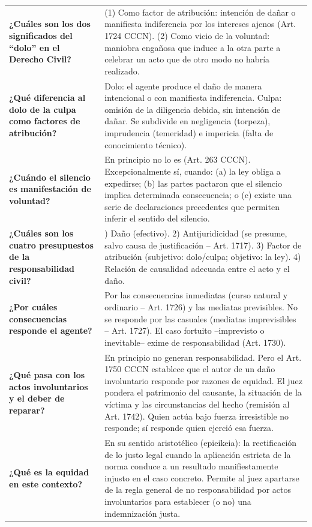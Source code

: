 \documentclass[12pt,oneside]{book}
\begin{document}
\begin{longtable}{
    >{\raggedright\arraybackslash}p{}
    >{\raggedright\arraybackslash}p{}
}
\textbf{¿Cuáles son los dos significados del ``dolo'' en el Derecho Civil?} &
(1) Como factor de atribución: intención de dañar o manifiesta indiferencia por los intereses ajenos (Art. 1724 CCCN). (2) Como vicio de la voluntad: maniobra engañosa que induce a la otra parte a celebrar un acto que de otro modo no habría realizado. \\

\textbf{¿Qué diferencia al dolo de la culpa como factores de atribución?} &
Dolo: el agente produce el daño de manera intencional o con manifiesta indiferencia. Culpa: omisión de la diligencia debida, sin intención de dañar. Se subdivide en negligencia (torpeza), imprudencia (temeridad) e impericia (falta de conocimiento técnico). \\

\textbf{¿Cuándo el silencio es manifestación de voluntad?} &
En principio no lo es (Art. 263 CCCN). Excepcionalmente sí, cuando: (a) la ley obliga a expedirse; (b) las partes pactaron que el silencio implica determinada consecuencia; o (c) existe una serie de declaraciones precedentes que permiten inferir el sentido del silencio. \\

\textbf{¿Cuáles son los cuatro presupuestos de la responsabilidad civil?} &
1) Daño (efectivo). 2) Antijuridicidad (se presume, salvo causa de justificación -- Art. 1717). 3) Factor de atribución (subjetivo: dolo/culpa; objetivo: la ley). 4) Relación de causalidad adecuada entre el acto y el daño. \\

\textbf{¿Por cuáles consecuencias responde el agente?} &
Por las consecuencias inmediatas (curso natural y ordinario -- Art. 1726) y las mediatas previsibles. No se responde por las casuales (mediatas imprevisibles -- Art. 1727). El caso fortuito --imprevisto o inevitable-- exime de responsabilidad (Art. 1730). \\

\textbf{¿Qué pasa con los actos involuntarios y el deber de reparar?} &
En principio no generan responsabilidad. Pero el Art. 1750 CCCN establece que el autor de un daño involuntario responde por razones de equidad. El juez pondera el patrimonio del causante, la situación de la víctima y las circunstancias del hecho (remisión al Art. 1742). Quien actúa bajo fuerza irresistible no responde; sí responde quien ejerció esa fuerza. \\

\textbf{¿Qué es la equidad en este contexto?} &
En su sentido aristotélico (epieikeia): la rectificación de lo justo legal cuando la aplicación estricta de la norma conduce a un resultado manifiestamente injusto en el caso concreto. Permite al juez apartarse de la regla general de no responsabilidad por actos involuntarios para establecer (o no) una indemnización justa. \\


\end{longtable}
\end{document}
